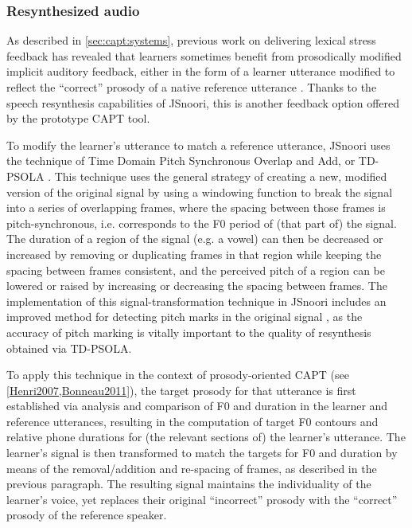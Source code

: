 			\subsubsection{Resynthesized audio}
			\label{sec:implicit:auditory:resynth}
			
			As described in \cref{sec:capt:systems}, previous work on delivering lexical stress feedback 
has revealed that learners sometimes benefit from prosodically modified implicit auditory feedback, either in the form of a learner utterance  modified to reflect the ``correct'' prosody of a native reference utterance \citep{Bonneau2011}.
			Thanks to the speech resynthesis capabilities of JSnoori, this is another feedback option offered by the prototype CAPT tool.
			
			To modify the learner's utterance to match a reference utterance, JSnoori uses the technique of Time Domain Pitch Synchronous Overlap and Add, or TD-PSOLA \citep{Moulines1990}. This technique uses the general strategy of creating a new, modified version of the original signal by using a windowing function to break the signal into a series of overlapping frames, where the spacing between those frames is pitch-synchronous, i.e. corresponds to the F0 period of (that part of) the signal. The duration of a region of the signal  (e.g. a vowel) can then be decreased or increased by removing or duplicating frames in that region while keeping the spacing between frames consistent, and  the perceived pitch of a region can be lowered or raised by increasing or decreasing the spacing between frames. The implementation of this signal-transformation technique in JSnoori includes an improved method for detecting pitch marks in the original signal \citep{Laprie1998,Colotte2002}, as the accuracy of pitch marking is vitally important to the quality of resynthesis obtained via TD-PSOLA.
			
			To apply this technique in the context of prosody-oriented CAPT (see \cref{Henri2007,Bonneau2011}), the target prosody for that utterance is first established via analysis and comparison of F0 and duration in the learner and reference utterances, resulting in the computation of  target F0 contours and relative phone durations for (the relevant sections of) the learner's utterance. The learner's signal is then transformed to match the targets for F0 and duration by means of the removal/addition and re-spacing of frames, as described in the previous paragraph. The resulting signal maintains the individuality of the learner's voice, yet replaces their original ``incorrect'' prosody with the ``correct'' prosody of the reference speaker. 
			
